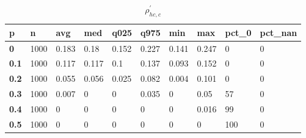 \begin{table}[h]
 \centering 
\footnotesize
\caption{$\rho_{hc,c}^\prime $}
\label{tab:alphahcc}
\begin{tabular}[h]{|l|l|l|l|l|l|l|l|l|l|
    } \hline
\textbf{ p} & \textbf{ n} & \textbf{ avg} & \textbf{ med} & \textbf{ q025} & \textbf{ q975} & \textbf{ min} & \textbf{ max} & \textbf{ pct\_0} & \textbf{ pct\_nan}
    \\ \hline
  \textbf{  0} & 1000 & 0.183 &  0.18 & 0.152 & 0.227 & 0.141 & 0.247 &   0 & 0
    \\ \hline
  \textbf{0.1} & 1000 & 0.117 & 0.117 &   0.1 & 0.137 & 0.093 & 0.152 &   0 & 0
    \\ \hline
  \textbf{0.2} & 1000 & 0.055 & 0.056 & 0.025 & 0.082 & 0.004 & 0.101 &   0 & 0
    \\ \hline
  \textbf{0.3} & 1000 & 0.007 &     0 &     0 & 0.035 &     0 &  0.05 &  57 & 0
    \\ \hline
  \textbf{0.4} & 1000 &     0 &     0 &     0 &     0 &     0 & 0.016 &  99 & 0
    \\ \hline
  \textbf{0.5} & 1000 &     0 &     0 &     0 &     0 &     0 &     0 & 100 & 0
    \\ \hline
 \end{tabular}
 \end{table}
